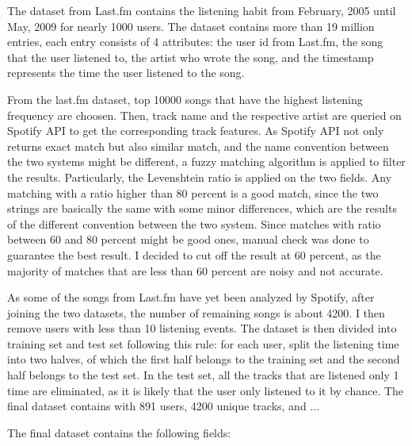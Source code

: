 The dataset from Last.fm contains the listening habit from February, 2005 until May, 2009 for nearly 1000 users. The dataset contains more than 19 million entries, each entry consists of 4 attributes: the user id from Last.fm, the song that the user listened to, the artist who wrote the song, and the timestamp represents the time the user listened to the song. 

From the last.fm dataset, top 10000 songs that have the highest listening frequency are choosen. Then, track name and the respective artist are queried on Spotify API to get the corresponding track features. As Spotify API not only returns exact match but also similar match, and the name convention between the two systems might be different, a fuzzy matching algorithm is applied to filter the results. Particularly, the Levenshtein ratio is applied on the two fields. Any matching with a ratio higher than 80 percent is a good match, since the two strings are basically the same with some minor differences, which are the results of the different convention between the two system. Since matches with ratio between 60 and 80 percent might be good ones, manual check was done to guarantee the best result. I decided to cut off the result at 60 percent, as the majority of matches that are less than 60 percent are noisy and not accurate.

As some of the songs from Last.fm have yet been analyzed by Spotify, after joining the two datasets, the number of remaining songs is about 4200. I then remove users with less than 10 listening events.
The dataset is then divided into training set and test set following this rule: for each user, split the listening time into two halves, of which the first half belongs to the training set and the second half belongs to the test set. In the test set, all the tracks that are listened only 1 time are eliminated, as it is likely that the user only listened to it by chance. The final dataset contains with 891 users, 4200 unique tracks, and ...

\noindent The final dataset contains the following fields:

